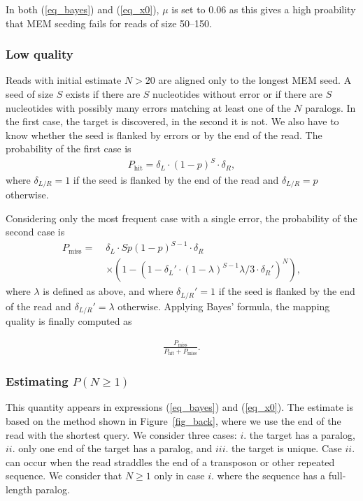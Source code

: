 \documentclass[a4,center,fleqn]{NAR}
\begin{document}
In both (\ref{eq_bayes}) and (\ref{eq_x0}), $\mu$ is set to 0.06 as this
gives a high proability that MEM seeding fails for reads of size 50--150.


\subsubsection{Low quality} Reads with initial estimate $N > 20$ are
aligned only to the longest MEM seed. A seed of size $S$ exists if
there are $S$ nucleotides without error or if there are $S$ nucleotides
with possibly many errors matching at least one of the $N$ paralogs. In the
first case, the target is discovered, in the second it is not. We also have
to know whether the seed is flanked by errors or by the end of the read.
The probability of the first case is
\begin{align*}
P_{\text{hit}} = \delta_L \cdot (1-p)^S \cdot \delta_R,
\end{align*}
where $\delta_{L/R} = 1$ if the seed is flanked by the end of the read and
$\delta_{L/R} = p$ otherwise.

Considering only the most frequent case with a single error, the
probability of the second case is
\begin{equation*}
\begin{split}
P_{\text{miss}} = \; &\delta_L \cdot Sp(1-p)^{S-1} \cdot \delta_R  \\
   &\times \left(1- \left( 1-\delta_L' \cdot(1-\lambda)^{S-1}\lambda/3
   \cdot \delta_R'\right)^N \right),
\end{split}
\end{equation*}
where $\lambda$ is defined as above, and where $\delta_{L/R}' = 1$ if the
seed is flanked by the end of the read and $\delta_{L/R}' = \lambda$ otherwise.
Applying Bayes' formula, the mapping quality is finally computed as

\begin{align}
\label{eq_low}
\frac{P_{\text{miss}}}{P_{\text{hit}} + P_{\text{miss}}}.
\end{align}

\subsubsection{Estimating $P(N \geq 1)$} This quantity appears in
expressions (\ref{eq_bayes}) and (\ref{eq_x0}). The estimate is based on
the method shown in Figure~\ref{fig_back}, where we use the end of the
read with the shortest query. We consider three cases: $i.$ the target has
a paralog, $ii.$ only one end of the target has a paralog, and $iii.$ the
target is unique. Case $ii.$ can occur when the read straddles the end of
a transposon or other repeated sequence. We consider that $N \geq 1$ only
in case $i.$ where the sequence has a full-length paralog.
\end{document}
